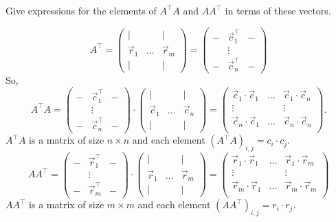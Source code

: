 Give expressions for the elements of $A^\top A$ and $AA^\top$ in terms of these vectors.


\begin{correction}
$$ A^\top = \left(\begin{matrix}
  | &  & | \\
 \vec{r}_1 & \hdots &   \vec{r}_m\\
  | &  & |
  \end{matrix} \right)
  =
  \left(\begin{matrix}
  - & \vec{c}_1^\top & - \\
   & \vdots &  \\
  - & \vec{c}_n^\top & -
  \end{matrix} \right)$$
  So,
$$A^\top A =   \left(\begin{matrix}
  - & \vec{c}_1^\top & - \\
   & \vdots &  \\
  - & \vec{c}_n^\top & -
  \end{matrix} \right) \cdot
  \left(\begin{matrix}
  | &  & | \\
 \vec{c}_1 & \hdots &   \vec{c}_n\\
  | &  & |
  \end{matrix} \right) =  \left( \begin{matrix} \vec{c}_1 \cdot \vec{c}_1 & \hdots & \vec{c}_1 \cdot \vec{c}_n \\
    \vdots & & \vdots \\
    \vec{c}_n \cdot \vec{c}_1 & \hdots & \vec{c}_n \cdot \vec{c}_n \\
    \end{matrix} \right)
  \text{.}$$
$A^\top A$ is a matrix of size $n \times n$ and each element $(A^\top A)_{i, j} = c_i \cdot c_j$.
  $$AA^\top = \left(\begin{matrix}
  - & \vec{r}_1^\top & - \\
   & \vdots &  \\
  - & \vec{r}_m^\top & -
  \end{matrix} \right) \cdot
  \left(\begin{matrix}
  | &  & | \\
 \vec{r}_1 & \hdots &   \vec{r}_m\\
  | &  & |
  \end{matrix} \right) =  \left( \begin{matrix} \vec{r}_1 \cdot \vec{r}_1 & \hdots & \vec{r}_1 \cdot \vec{r}_m \\
    \vdots & & \vdots \\
    \vec{r}_m \cdot \vec{r}_1 & \hdots & \vec{r}_m \cdot \vec{r}_m \\
    \end{matrix} \right)
  $$ 
  $AA^\top$ is a matrix of size $m \times m$ and each element $(AA^\top)_{i, j} = r_i \cdot r_j$.  
\end{correction}


